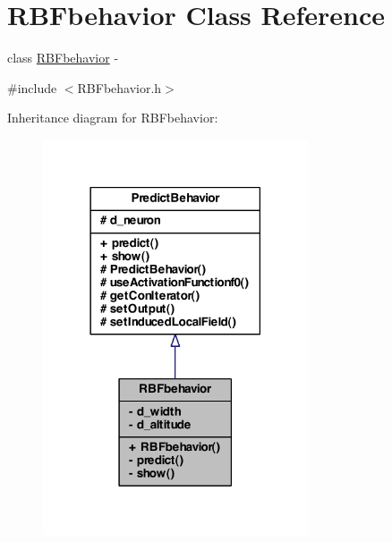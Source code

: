 \hypertarget{class_r_b_fbehavior}{
\section{RBFbehavior Class Reference}
\label{class_r_b_fbehavior}
}


class \hyperlink{class_r_b_fbehavior}{RBFbehavior} -\/  




{\ttfamily \#include $<$RBFbehavior.h$>$}



Inheritance diagram for RBFbehavior:
\nopagebreak
\begin{figure}[H]
\begin{center}
\leavevmode
\includegraphics[width=222pt]{class_r_b_fbehavior__inherit__graph}
\end{center}
\end{figure}


